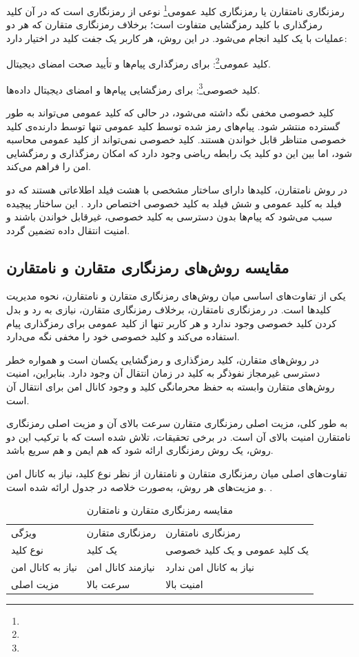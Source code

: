 رمزنگاری نامتقارن یا رمزنگاری کلید عمومی\footnote{} نوعی از رمزنگاری است که در آن کلید رمزگذاری با کلید رمزگشایی متفاوت است؛ برخلاف رمزنگاری متقارن که هر دو عملیات با یک کلید انجام می‌شود. در این روش، هر کاربر یک جفت کلید در اختیار دارد:

کلید عمومی\footnote{}: برای رمزگذاری پیام‌ها و تأیید صحت امضای دیجیتال.

کلید خصوصی\footnote{}: برای رمزگشایی پیام‌ها و امضای دیجیتال داده‌ها.

کلید خصوصی مخفی نگه داشته می‌شود، در حالی که کلید عمومی می‌تواند به طور گسترده منتشر شود. پیام‌های رمز شده توسط کلید عمومی تنها توسط دارنده‌ی کلید خصوصی متناظر قابل خواندن هستند. کلید خصوصی نمی‌تواند از کلید عمومی محاسبه شود، اما بین این دو کلید یک رابطه ریاضی وجود دارد که امکان رمزگذاری و رمزگشایی امن را فراهم می‌کند.

در روش نامتقارن، کلیدها دارای ساختار مشخصی با هشت فیلد اطلاعاتی هستند که دو فیلد به کلید عمومی و شش فیلد به کلید خصوصی اختصاص دارد \cite{ref28}.  این ساختار پیچیده سبب می‌شود که پیام‌ها بدون دسترسی به کلید خصوصی، غیرقابل خواندن باشند و امنیت انتقال داده تضمین گردد.

\subsection{مقایسه روش‌های رمزنگاری متقارن و نامتقارن}

یکی از تفاوت‌های اساسی میان روش‌های رمزنگاری متقارن و نامتقارن، نحوه مدیریت کلیدها است. در رمزنگاری نامتقارن، برخلاف رمزنگاری متقارن، نیازی به رد و بدل کردن کلید خصوصی وجود ندارد و هر کاربر تنها از کلید عمومی برای رمزگذاری پیام استفاده می‌کند و کلید خصوصی خود را مخفی نگه می‌دارد.

در روش‌های متقارن، کلید رمزگذاری و رمزگشایی یکسان است و همواره خطر دسترسی غیرمجاز نفوذگر به کلید در زمان انتقال آن وجود دارد. بنابراین، امنیت روش‌های متقارن وابسته به حفظ محرمانگی کلید و وجود کانال امن برای انتقال آن است.

به طور کلی، مزیت اصلی رمزنگاری متقارن سرعت بالای آن و مزیت اصلی رمزنگاری نامتقارن امنیت بالای آن است. در برخی تحقیقات، تلاش شده است که با ترکیب این دو روش، یک روش رمزنگاری ارائه شود که هم ایمن و هم سریع باشد\cite{ref29}.

تفاوت‌های اصلی میان رمزنگاری متقارن و نامتقارن از نظر نوع کلید، نیاز به کانال امن و مزیت‌های هر روش، به‌صورت خلاصه در جدول  ارائه شده است. \cite{ref30}.

\begin{table}[h]
\centering
\small
\begin{tabular}{lll}
\hline
ویژگی & رمزنگاری متقارن & رمزنگاری نامتقارن \\
نوع کلید & یک کلید & یک کلید عمومی و یک کلید خصوصی \\
نیاز به کانال امن & نیازمند کانال امن & نیاز به کانال امن ندارد \\
مزیت اصلی & سرعت بالا & امنیت بالا \\
\hline
\end{tabular}
\caption{مقایسه رمزنگاری متقارن و نامتقارن}
\end{table}

